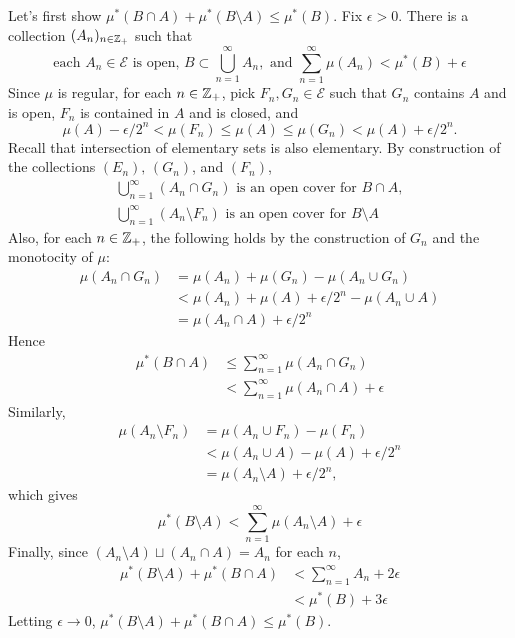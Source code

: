 \documentclass[12pt]{article}
\begin{document}
Let's first show $\mu^{*}(B \cap A) + \mu^{*} (B \setminus A) \leq \mu^{*}(B)$. 
Fix $\epsilon > 0$.
There is a collection $(A_n)_{n \in \mathbb{Z}_{+}}$ such that 
$$\text{each } A_n \in \mathscr{E} \text{ is open, } B \subset \bigcup_{n = 1}^{\infty} A_n, \text{ and } \sum_{n = 1}^{\infty} \mu(A_n) < \mu^{*}(B) + \epsilon$$
Since $\mu$ is regular, for each $n \in \mathbb{Z}_{+}$, pick $F_n, G_n \in \mathscr{E}$ such that $G_n$ contains $A$ and is open, $F_n$ is contained in $A$ and is closed, and 
$$\mu(A) - \epsilon / 2^n < \mu(F_n) \leq \mu(A) \leq \mu(G_n) < \mu(A) + \epsilon / 2^{n}.$$
Recall that intersection of elementary sets is also elementary. 
By construction of the collections $(E_n), \, (G_n)$, and $(F_n)$, 
\begin{gather*}
  \bigcup_{n = 1}^{\infty} (A_n \cap G_n) \text{ is an open cover for } B \cap A, \\  
  \bigcup_{n = 1}^{\infty} (A_n \setminus F_n) \text{ is an open cover for } B \setminus A
\end{gather*}
Also, for each $n \in \mathbb{Z}_{+}$, the following holds by the construction of $G_n$ and the monotocity of $\mu$: 
\begin{align*}
  \mu(A_n \cap G_n) & = \mu(A_n) + \mu(G_n) - \mu(A_n \cup G_n)  \\ 
					 & < \mu(A_n) + \mu(A) + \epsilon / 2^n - \mu(A_n \cup A) \\ 
					 & = \mu(A_n \cap A) + \epsilon / 2^n
\end{align*}
Hence 
\begin{align*}
  \mu^{*} (B \cap A) & \leq \sum_{n = 1}^{\infty} \mu(A_n \cap G_n)  \\ 
					 & < \sum_{n = 1}^{\infty} \mu(A_n \cap A) + \epsilon
\end{align*} 
Similarly, 
\begin{align*}
  \mu(A_n \setminus F_n) & = \mu(A_n \cup F_n) - \mu(F_n) \\ 
						 & < \mu(A_n \cup A) - \mu(A) + \epsilon / 2^n \\ 
						 & = \mu(A_n \setminus A) + \epsilon / 2^n,
\end{align*}
which gives 
$$\mu^{*}(B \setminus A) < \sum_{n = 1}^{\infty} \mu(A_n \setminus A) + \epsilon$$
Finally, since $(A_n \setminus A) \sqcup (A_n \cap A) = A_n$ for each $n$, 
\begin{align*}
  \mu^{*}(B \setminus A) + \mu^{*}(B \cap A) & < \sum_{n = 1}^{\infty} A_n + 2\epsilon \\ 
											 & < \mu^{*}(B) + 3\epsilon
\end{align*} 
Letting $\epsilon \rightarrow 0$, $\mu^{*} (B \setminus A) + \mu^{*} (B \cap A) \leq \mu^{*} (B)$.
\end{document}
